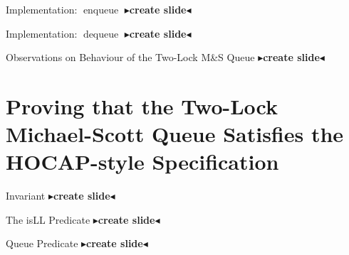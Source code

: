 \documentclass[9pt]{beamer}
\newcommand{\enqueue}{\operatorname{enqueue}}
\newcommand{\dequeue}{\operatorname{dequeue}}
\newcommand{\msq}{M\&S Queue}
\newcommand{\tlmsq}{Two-Lock \msq{}}
\newcommand{\todo}[1]{{\color[rgb]{.5,0,0}\textbf{$\blacktriangleright$#1$\blacktriangleleft$}}}
\begin{document}
\begin{frame}{Implementation: $\enqueue$}
  \todo{create slide}
\end{frame}

\begin{frame}{Implementation: $\dequeue$}
  \todo{create slide}
\end{frame}

\begin{frame}{Observations on Behaviour of the \tlmsq}
  \todo{create slide}
\end{frame}


\section{Proving that the Two-Lock Michael-Scott Queue Satisfies the HOCAP-style Specification}

\begin{frame}{Invariant}
  \todo{create slide}
\end{frame}

\begin{frame}{The isLL Predicate}
  \todo{create slide}
\end{frame}

\begin{frame}{Queue Predicate}
  \todo{create slide}
\end{frame}
\end{document}
